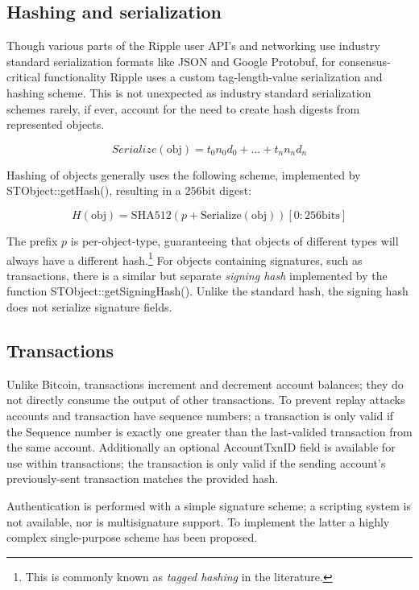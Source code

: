 \documentclass{article}
\begin{document}
\subsection{Hashing and serialization}

Though various parts of the Ripple user API's and networking use industry
standard serialization formats like JSON and Google Protobuf, for
consensus-critical functionality Ripple uses a custom tag-length-value
serialization and hashing scheme. This is not unexpected as industry standard
serialization schemes rarely, if ever, account for the need to create hash
digests from represented objects.

\begin{equation}
    \textit{Serialize}(\text{obj}) = t_0 n_0 d_0 + \hdots + t_n n_n d_n
\end{equation}

Hashing of objects generally uses the following scheme, implemented by
STObject::getHash(), resulting in a $256\text{bit}$ digest:

\begin{equation}
    H(\text{obj}) = \text{SHA512}(p + \text{Serialize}(\text{obj}))[0:256\text{bits}]
\end{equation}

The prefix $p$ is per-object-type, guaranteeing that objects of different types
will always have a different hash.\footnote{This is commonly known as
\emph{tagged hashing} in the literature.} For objects containing signatures,
such as transactions, there is a similar but separate \emph{signing hash}
implemented by the function STObject::getSigningHash(). Unlike the standard
hash, the signing hash does not serialize signature fields.


\subsection{Transactions}

Unlike Bitcoin, transactions increment and decrement account balances; they do
not directly consume the output of other transactions. To prevent replay
attacks accounts and transaction have sequence numbers; a transaction is only
valid if the Sequence number is exactly one greater than the last-valided
transaction from the same account. Additionally an optional AccountTxnID field
is available for use within transactions; the transaction is only valid if the
sending account's previously-sent transaction matches the provided hash.

Authentication is performed with a simple signature scheme; a scripting system
is not available, nor is multisignature support. To implement the latter a
highly complex single-purpose scheme\cite{ripple-wiki-multisign} has been
proposed.
\end{document}
